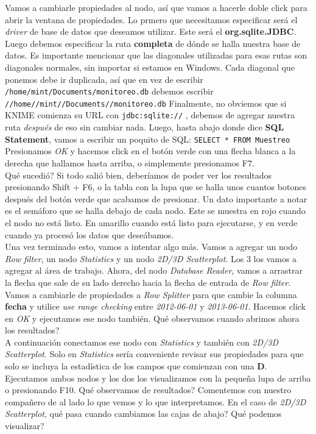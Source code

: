 \documentclass[10pt,letterpaper]{article}
\newcommand{\inlinecode}[1]{
\colorbox{light-gray}{\texttt{#1}}
}
\begin{document}
Vamos a cambiarle propiedades al nodo, as\'i que vamos a hacerle doble click para abrir la ventana de propiedades. Lo prmero que necesitamos especificar ser\'a el \emph{driver} de base de datos que deseamos utilizar. Este ser\'a el \textbf{org.sqlite.JDBC}. Luego debemos especificar la ruta \textbf{completa} de d\'onde se halla nuestra base de datos. Es importante mencionar que las diagonales utilizadas para esas rutas son diagonales normales, sin importar si estamos en Windows. Cada diagonal que ponemos debe ir duplicada, as\'i que en vez de escribir \inlinecode{/home/mint/Documents/monitoreo.db} debemos escribir \inlinecode{//home//mint//Documents//monitoreo.db} Finalmente, no obviemos que si KNIME comienza su URL con \inlinecode{jdbc:sqlite://}, debemos de agregar nuestra ruta \emph{despu\'es} de eso sin cambiar nada. Luego, hasta abajo donde dice \textbf{SQL Statement}, vamos a escribir un poquito de SQL: \inlinecode{SELECT * FROM Muestreo} Presionamos \emph{OK} y hacemos click en el bot\'on verde con una flecha blanca a la derecha que hallamos hasta arriba, o simplemente presionamos F7.\\

Qu\'e sucedi\'o? Si todo sali\'o bien, deber\'iamos de poder ver los resultados presionando Shift + F6, o la tabla con la lupa que se halla unos cuantos botones despu\'es del bot\'on verde que acabamos de presionar. Un dato importante a notar es el sem\'aforo que se halla debajo de cada nodo. Este se muestra en rojo cuando el nodo no est\'a listo. En amarillo cuando est\'a listo para ejecutarse, y en verde cuando ya proces\'o los datos que dese\'abamos.\\

Una vez terminado esto, vamos a intentar algo m\'as. Vamos a agregar un nodo \emph{Row filter}, un nodo \emph{Statistics} y un nodo \emph{2D/3D Scatterplot}. Los 3 los vamos a agregar al \'area de trabajo. Ahora, del nodo \emph{Database Reader}, vamos a arrastrar la flecha que sale de su lado derecho hacia la flecha de entrada de \emph{Row filter}. Vamos a cambiarle de propiedades a \emph{Row Splitter} para que cambie la columna \textbf{fecha} y utilice \emph{use range checking} entre \emph{2012-06-01} y \emph{2013-06-01}. Hacemos click en \emph{OK} y ejecutamos ese nodo tambi\'en. Qu\'e observamos cuando abrimos ahora los resultados?\\

A continuaci\'on conectamos ese nodo con \emph{Statistics} y tambi\'en con \emph{2D/3D Scatterplot}. Solo en \emph{Statistics} ser\'ia conveniente revisar sus propiedades para que solo se incluya la estad\'istica de los campos que comienzan con una \textbf{D}. Ejecutamos ambos nodos y los dos los visualizamos con la peque\~na lupa de arriba o presionando F10. Qu\'e observamos de resultados? Comentemos con nuestro compa\~nero de al lado lo que vemos y lo que interpretamos. En el caso de \emph{2D/3D Scatterplot}, qu\'e pasa cuando cambiamos las cajas de abajo? Qu\'e podemos visualizar?
\end{document}
